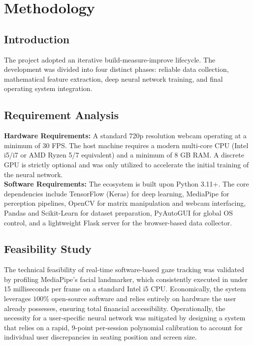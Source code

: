 \documentclass[12pt,a4paper]{report}
\begin{document}
\chapter{Methodology}
\section{Introduction}
The project adopted an iterative build-measure-improve lifecycle. The development was divided into four distinct phases: reliable data collection, mathematical feature extraction, deep neural network training, and final operating system integration.

\section{Requirement Analysis}
\textbf{Hardware Requirements:} A standard 720p resolution webcam operating at a minimum of 30 FPS. The host machine requires a modern multi-core CPU (Intel i5/i7 or AMD Ryzen 5/7 equivalent) and a minimum of 8 GB RAM. A discrete GPU is strictly optional and was only utilized to accelerate the initial training of the neural network. \\
\textbf{Software Requirements:} The ecosystem is built upon Python 3.11+. The core dependencies include TensorFlow (Keras) for deep learning, MediaPipe for perception pipelines, OpenCV for matrix manipulation and webcam interfacing, Pandas and Scikit-Learn for dataset preparation, PyAutoGUI for global OS control, and a lightweight Flask server for the browser-based data collector.

\section{Feasibility Study}
The technical feasibility of real-time software-based gaze tracking was validated by profiling MediaPipe's facial landmarker, which consistently executed in under 15 milliseconds per frame on a standard Intel i5 CPU. Economically, the system leverages $100\%$ open-source software and relies entirely on hardware the user already possesses, ensuring total financial accessibility. Operationally, the necessity for a user-specific neural network was mitigated by designing a system that relies on a rapid, 9-point per-session polynomial calibration to account for individual user discrepancies in seating position and screen size.
\end{document}
